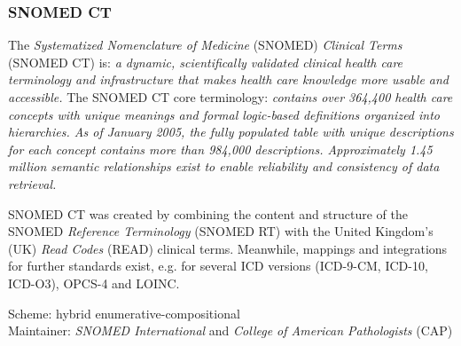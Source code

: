 %
%
%
%
%
%
%

\subsubsection{SNOMED CT}
\label{snomed_ct_heading}

The \emph{Systematized Nomenclature of Medicine} (SNOMED) \emph{Clinical Terms}
(SNOMED CT) is: \textit{a dynamic, scientifically validated clinical health care
terminology and infrastructure that makes health care knowledge more usable and
accessible.} The SNOMED CT core terminology: \textit{contains over 364,400
health care concepts with unique meanings and formal logic-based definitions
organized into hierarchies. As of January 2005, the fully populated table with
unique descriptions for each concept contains more than 984,000 descriptions.
Approximately 1.45 million semantic relationships exist to enable reliability
and consistency of data retrieval.} \cite{snomed}

SNOMED CT was created by combining the content and structure of the SNOMED
\emph{Reference Terminology} (SNOMED RT) with the United Kingdom's (UK)
\emph{Read Codes} (READ) clinical terms. Meanwhile, mappings and integrations
for further standards exist, e.g. for several ICD versions (ICD-9-CM, ICD-10,
ICD-O3), OPCS-4 and LOINC.

Scheme: hybrid enumerative-compositional\\
Maintainer: \emph{SNOMED International} and \emph{College of American Pathologists} (CAP)

